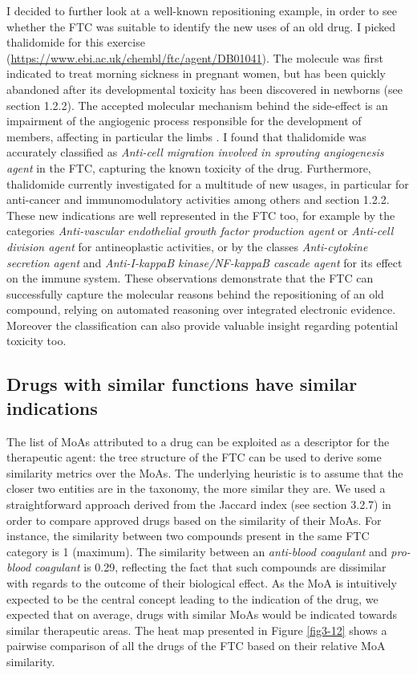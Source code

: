 I decided to further look at a well-known repositioning example, in order to see whether the FTC was suitable to identify the new uses of an old drug. I picked thalidomide for this exercise (\url{https://www.ebi.ac.uk/chembl/ftc/agent/DB01041}). The molecule was first indicated to treat morning sickness in pregnant women, but has been quickly abandoned after its developmental toxicity has been discovered in newborns (see section 1.2.2). The accepted molecular mechanism behind the side-effect is  an impairment of the angiogenic process responsible for the development of members, affecting in particular the limbs \citep{therapontos2009thalidomide}. I found that thalidomide was accurately classified as \emph{Anti-cell migration involved in sprouting angiogenesis agent} in the FTC, capturing the known toxicity of the drug. Furthermore, thalidomide currently investigated for a multitude of new usages, in particular for anti-cancer and immunomodulatory activities among others \citep{teo2005thalidomide} and section 1.2.2. These new indications are well represented in the FTC too, for example by the categories \emph{Anti-vascular endothelial growth factor production agent} or \emph{Anti-cell division agent} for antineoplastic activities, or by the classes \emph{Anti-cytokine secretion agent} and \emph{Anti-I-kappaB kinase/NF-kappaB cascade agent} for its effect on the immune system. These observations demonstrate that the FTC can successfully capture the molecular reasons behind the repositioning of an old compound, relying on automated reasoning over integrated electronic evidence. Moreover the classification can also provide valuable insight regarding potential toxicity too.

\subsection{Drugs with similar functions have similar indications}
The list of MoAs attributed to a drug can be exploited as a descriptor for the therapeutic agent: the tree structure of the FTC can be used to derive some similarity metrics over the MoAs. The underlying heuristic is to assume that the closer two entities are in the taxonomy, the more similar they are. We used a straightforward approach derived from the Jaccard index (see section 3.2.7) in order to compare approved drugs based on the similarity of their MoAs. For instance, the similarity between two compounds present in the same FTC category is 1 (maximum). The similarity between an \emph{anti-blood coagulant} and \emph{pro-blood coagulant} is 0.29, reflecting the fact that such compounds are dissimilar with regards to the outcome of their biological effect. As the MoA is intuitively expected to be the central concept leading to the indication of the drug, we expected that on average, drugs with similar MoAs would be indicated towards similar therapeutic areas.
The heat map presented in Figure \ref{fig3-12} shows a pairwise comparison of all the drugs of the FTC based on their relative MoA similarity.

